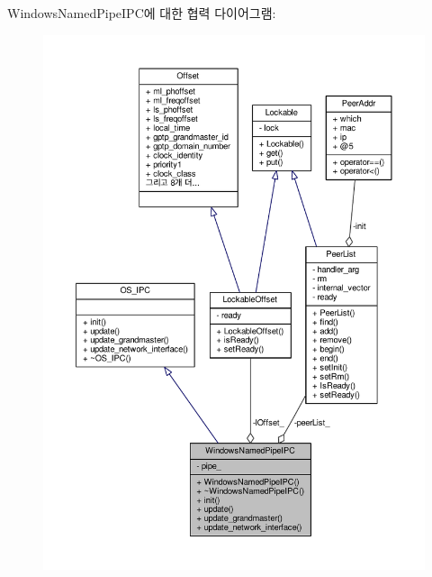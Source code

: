 Windows\+Named\+Pipe\+I\+P\+C에 대한 협력 다이어그램\+:
\nopagebreak
\begin{figure}[H]
\begin{center}
\leavevmode
\includegraphics[width=350pt]{class_windows_named_pipe_i_p_c__coll__graph}
\end{center}
\end{figure}
